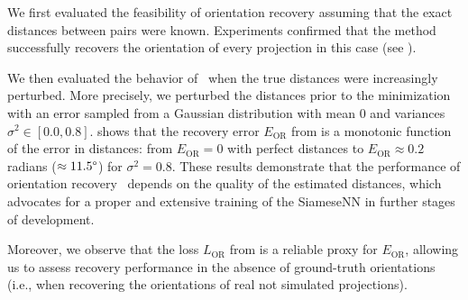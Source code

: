 We first evaluated the feasibility of orientation recovery assuming that the exact distances between pairs were known.
Experiments confirmed that the method successfully recovers the orientation of every projection in this case (see ).

We then evaluated the behavior of~ when the true distances were increasingly perturbed.
More precisely, we perturbed the distances prior to the minimization with an error sampled from a Gaussian distribution with mean $0$ and variances $\sigma^2 \in [0.0, 0.8]$.
 shows that the recovery error $E_\text{OR}$ from  is a monotonic function of the error in distances: from $E_\text{OR} = 0$ with perfect distances to $E_\text{OR} \approx 0.2$ radians ($\approx 11.5\degree$) for $\sigma^2 = 0.8$.
These results demonstrate that the performance of orientation recovery~ depends on the quality of the estimated distances, which advocates for a proper and extensive training of the SiameseNN in further stages of development.

Moreover, we observe that the loss $L_\text{OR}$ from  is a reliable proxy for $E_\text{OR}$, allowing us to assess recovery performance in the absence of ground-truth orientations (i.e., when recovering the orientations of real not simulated projections).

